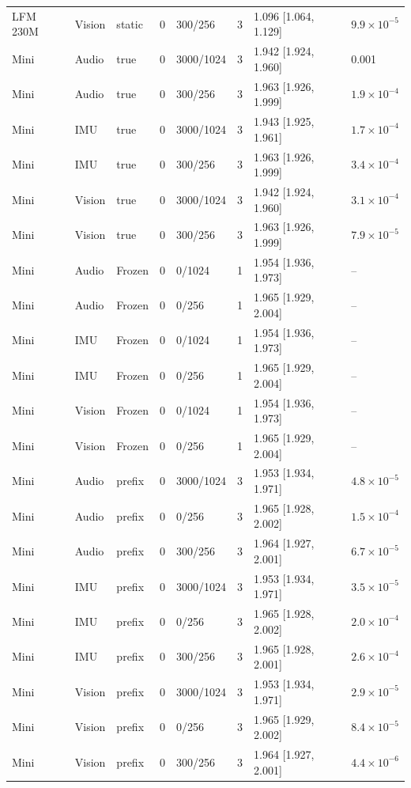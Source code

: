 {\begin{longtable}{@{}llllllll@{}}
LFM 230M & Vision & static & 0 & 300/256 & 3 & 1.096 [1.064, 1.129] & $9.9\times10^{-5}$ \\
Mini & Audio & true & 0 & 3000/1024 & 3 & 1.942 [1.924, 1.960] & 0.001 \\
Mini & Audio & true & 0 & 300/256 & 3 & 1.963 [1.926, 1.999] & $1.9\times10^{-4}$ \\
Mini & IMU & true & 0 & 3000/1024 & 3 & 1.943 [1.925, 1.961] & $1.7\times10^{-4}$ \\
Mini & IMU & true & 0 & 300/256 & 3 & 1.963 [1.926, 1.999] & $3.4\times10^{-4}$ \\
Mini & Vision & true & 0 & 3000/1024 & 3 & 1.942 [1.924, 1.960] & $3.1\times10^{-4}$ \\
Mini & Vision & true & 0 & 300/256 & 3 & 1.963 [1.926, 1.999] & $7.9\times10^{-5}$ \\
Mini & Audio & Frozen & 0 & 0/1024 & 1 & 1.954 [1.936, 1.973] & -- \\
Mini & Audio & Frozen & 0 & 0/256 & 1 & 1.965 [1.929, 2.004] & -- \\
Mini & IMU & Frozen & 0 & 0/1024 & 1 & 1.954 [1.936, 1.973] & -- \\
Mini & IMU & Frozen & 0 & 0/256 & 1 & 1.965 [1.929, 2.004] & -- \\
Mini & Vision & Frozen & 0 & 0/1024 & 1 & 1.954 [1.936, 1.973] & -- \\
Mini & Vision & Frozen & 0 & 0/256 & 1 & 1.965 [1.929, 2.004] & -- \\
Mini & Audio & prefix & 0 & 3000/1024 & 3 & 1.953 [1.934, 1.971] & $4.8\times10^{-5}$ \\
Mini & Audio & prefix & 0 & 0/256 & 3 & 1.965 [1.928, 2.002] & $1.5\times10^{-4}$ \\
Mini & Audio & prefix & 0 & 300/256 & 3 & 1.964 [1.927, 2.001] & $6.7\times10^{-5}$ \\
Mini & IMU & prefix & 0 & 3000/1024 & 3 & 1.953 [1.934, 1.971] & $3.5\times10^{-5}$ \\
Mini & IMU & prefix & 0 & 0/256 & 3 & 1.965 [1.928, 2.002] & $2.0\times10^{-4}$ \\
Mini & IMU & prefix & 0 & 300/256 & 3 & 1.965 [1.928, 2.001] & $2.6\times10^{-4}$ \\
Mini & Vision & prefix & 0 & 3000/1024 & 3 & 1.953 [1.934, 1.971] & $2.9\times10^{-5}$ \\
Mini & Vision & prefix & 0 & 0/256 & 3 & 1.965 [1.929, 2.002] & $8.4\times10^{-5}$ \\
Mini & Vision & prefix & 0 & 300/256 & 3 & 1.964 [1.927, 2.001] & $4.4\times10^{-6}$ \\

\end{longtable}}
